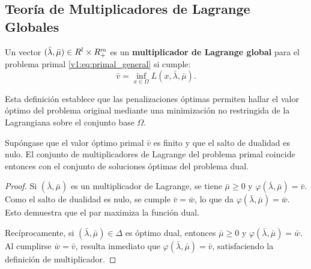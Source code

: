 \subsection{Teoría de Multiplicadores de Lagrange Globales}

\begin{definition}\label{v1:def:lagrange_multiplier_global}
    Un vector $(\bar{\lambda}, \bar{\mu}) \in R^l \times R^m_+$ es un \textbf{multiplicador de Lagrange global} para el problema primal \eqref{v1:eq:primal_general} si cumple:
    \begin{equation}
        \bar{v} = \inf_{x \in \Omega} L(x, \bar{\lambda}, \bar{\mu}).
        \label{v1:eq:def_multiplier}
    \end{equation}
\end{definition}

Esta definición establece que las penalizaciones óptimas permiten hallar el valor óptimo del problema original mediante una minimización no restringida de la Lagrangiana sobre el conjunto base $\Omega$.

\begin{proposition}\label{v1:prop:multipliers_dual_solutions}
    Supóngase que el valor óptimo primal $\bar{v}$ es finito y que el salto de dualidad es nulo. El conjunto de multiplicadores de Lagrange del problema primal coincide entonces con el conjunto de soluciones óptimas del problema dual.
\end{proposition}

\begin{proof}
    Si $(\bar{\lambda}, \bar{\mu})$ es un multiplicador de Lagrange, se tiene $\bar{\mu} \ge 0$ y $\varphi(\bar{\lambda}, \bar{\mu}) = \bar{v}$. Como el salto de dualidad es nulo, se cumple $\bar{v} = \bar{w}$, lo que da $\varphi(\bar{\lambda}, \bar{\mu}) = \bar{w}$. Esto demuestra que el par maximiza la función dual.
    
    Recíprocamente, si $(\bar{\lambda}, \bar{\mu}) \in \Delta$ es óptimo dual, entonces $\bar{\mu} \ge 0$ y $\varphi(\bar{\lambda}, \bar{\mu}) = \bar{w}$. Al cumplirse $\bar{w} = \bar{v}$, resulta inmediato que $\varphi(\bar{\lambda}, \bar{\mu}) = \bar{v}$, satisfaciendo la definición de multiplicador.
\end{proof}

